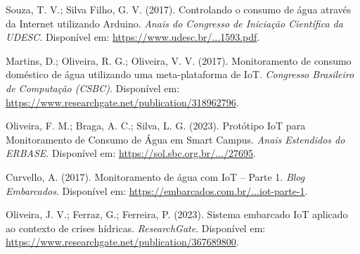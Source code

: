 \documentclass[12pt]{article}
\begin{document}
\vspace{0.4cm}
\noindent
[2] Souza, T. V.; Silva Filho, G. V. (2017). Controlando o consumo de água através da Internet utilizando Arduino. \emph{Anais do Congresso de Iniciação Científica da UDESC}. Disponível em: \href{https://www.udesc.br/arquivos/ceplan/id_cpmenu/1593/4520170911VF_16681133920465_1593.pdf}{https://www.udesc.br/...1593.pdf}.

\vspace{0.4cm}
\noindent
[3] Martins, D.; Oliveira, R. G.; Oliveira, V. V. (2017). Monitoramento de consumo doméstico de água utilizando uma meta-plataforma de IoT. \emph{Congresso Brasileiro de Computação (CSBC)}. Disponível em: \href{https://www.researchgate.net/publication/318962796}{https://www.researchgate.net/publication/318962796}.

\vspace{0.4cm}
\noindent
[4] Oliveira, F. M.; Braga, A. C.; Silva, L. G. (2023). Protótipo IoT para Monitoramento de Consumo de Água em Smart Campus. \emph{Anais Estendidos do ERBASE}. Disponível em: \href{https://sol.sbc.org.br/index.php/erbase/article/view/27695}{https://sol.sbc.org.br/.../27695}.

\vspace{0.4cm}
\noindent
[5] Curvello, A. (2017). Monitoramento de água com IoT – Parte 1. \emph{Blog Embarcados}. Disponível em: \href{https://embarcados.com.br/monitoramento-de-agua-com-iot-parte-1}{https://embarcados.com.br/...iot-parte-1}.

\vspace{0.4cm}
\noindent
[6] Oliveira, J. V.; Ferraz, G.; Ferreira, P. (2023). Sistema embarcado IoT aplicado ao contexto de crises hídricas. \emph{ResearchGate}. Disponível em: \href{https://www.researchgate.net/publication/367689800}{https://www.researchgate.net/publication/367689800}.
\end{document}
